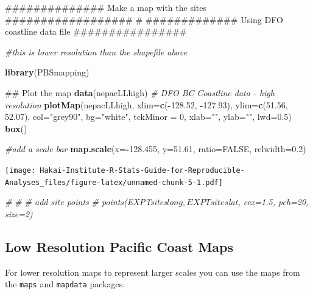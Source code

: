 \documentclass[]{book}
\newenvironment{Shaded}{\begin{snugshade}}{\end{snugshade}}
\newcommand{\KeywordTok}[1]{\textcolor[rgb]{0.13,0.29,0.53}{\textbf{#1}}}
\newcommand{\DataTypeTok}[1]{\textcolor[rgb]{0.13,0.29,0.53}{#1}}
\newcommand{\DecValTok}[1]{\textcolor[rgb]{0.00,0.00,0.81}{#1}}
\newcommand{\FloatTok}[1]{\textcolor[rgb]{0.00,0.00,0.81}{#1}}
\newcommand{\StringTok}[1]{\textcolor[rgb]{0.31,0.60,0.02}{#1}}
\newcommand{\CommentTok}[1]{\textcolor[rgb]{0.56,0.35,0.01}{\textit{#1}}}
\newcommand{\OtherTok}[1]{\textcolor[rgb]{0.56,0.35,0.01}{#1}}
\newcommand{\OperatorTok}[1]{\textcolor[rgb]{0.81,0.36,0.00}{\textbf{#1}}}
\newcommand{\NormalTok}[1]{#1}
\begin{document}
\begin{Shaded}
\begin{Highlighting}[]
\NormalTok{############## Make a map with the sites ################## #}
\NormalTok{############# Using DFO coastline data file ################}

\CommentTok{#this is lower resolution than the shapefile above}

\KeywordTok{library}\NormalTok{(PBSmapping)}

\NormalTok{## Plot the map}
\KeywordTok{data}\NormalTok{(nepacLLhigh)       }\CommentTok{# DFO BC Coastline data - high resolution}
\KeywordTok{plotMap}\NormalTok{(nepacLLhigh, }\DataTypeTok{xlim=}\KeywordTok{c}\NormalTok{(}\OperatorTok{-}\FloatTok{128.52}\NormalTok{, }\OperatorTok{-}\FloatTok{127.93}\NormalTok{), }\DataTypeTok{ylim=}\KeywordTok{c}\NormalTok{(}\FloatTok{51.56}\NormalTok{, }\FloatTok{52.07}\NormalTok{), }\DataTypeTok{col=}\StringTok{"grey90"}\NormalTok{, }\DataTypeTok{bg=}\StringTok{"white"}\NormalTok{, }\DataTypeTok{tckMinor =} \DecValTok{0}\NormalTok{,}
        \DataTypeTok{xlab=}\StringTok{""}\NormalTok{, }\DataTypeTok{ylab=}\StringTok{""}\NormalTok{, }\DataTypeTok{lwd=}\FloatTok{0.5}\NormalTok{)}
\KeywordTok{box}\NormalTok{()}

\CommentTok{#add a scale bar}
\KeywordTok{map.scale}\NormalTok{(}\DataTypeTok{x=}\OperatorTok{-}\FloatTok{128.455}\NormalTok{, }\DataTypeTok{y=}\FloatTok{51.61}\NormalTok{, }\DataTypeTok{ratio=}\OtherTok{FALSE}\NormalTok{, }\DataTypeTok{relwidth=}\FloatTok{0.2}\NormalTok{)}
\end{Highlighting}
\end{Shaded}

\texttt{[image: Hakai-Institute-R-Stats-Guide-for-Reproducible-Analyses\_files/figure-latex/unnamed-chunk-5-1.pdf]}

\begin{Shaded}
\begin{Highlighting}[]
\CommentTok{# }
\CommentTok{# # add site points}
\CommentTok{# points(EXPTsites$long, EXPTsites$lat, cex=1.5, pch=20, size=2)}
\end{Highlighting}
\end{Shaded}

\subsection{Low Resolution Pacific Coast
Maps}\label{low-resolution-pacific-coast-maps}

For lower resolution maps to represent larger scales you can use the
maps from the \texttt{maps} and \texttt{mapdata} packages.
\end{document}
